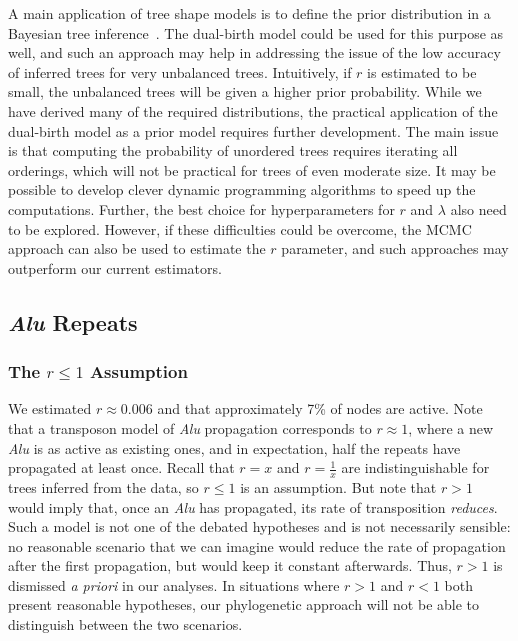 A main application of tree shape models is to define the prior distribution in a Bayesian tree inference~\cite{Drummond2007,Mooers2012}. The dual-birth model could be used for this purpose as well, and such an approach may help in addressing the issue of the low accuracy of inferred trees for very unbalanced trees. Intuitively, if $r$ is estimated to be small, the unbalanced trees will be given a higher prior probability. While we have derived many of the required distributions, the practical application of the dual-birth model as a prior model requires further development. The main issue is that computing the probability of unordered trees requires iterating all orderings, which will not be practical for trees of even moderate size. It may be possible to develop clever dynamic programming algorithms to speed up the computations. Further, the best choice for hyperparameters for $r$ and $\lambda$ also need to be explored. However, if these difficulties could be overcome, the \gls{MCMC} approach can also be used to estimate the $r$ parameter, and such approaches may outperform our current estimators.

\subsection{{\em Alu} Repeats}
\subsubsection{The $r\leq1$ Assumption}
We estimated $r\approx0.006$ and that approximately 7\% of nodes are active. Note that a transposon model of {\em Alu} propagation corresponds to $r\approx1$, where a new {\em Alu} is as active as existing ones, and in expectation, half the repeats have propagated at least once. Recall that $r=x$ and $r=\frac{1}{x}$  are indistinguishable for trees inferred from the data, so $r\leq 1$ is an assumption. But note that $r>1$ would imply that, once an {\em Alu} has propagated, its rate of transposition {\em reduces}. Such a model is not one of the debated hypotheses and is not necessarily sensible: no reasonable scenario that we can imagine would reduce the rate of propagation after the first propagation, but would keep it constant afterwards. Thus, $r>1$ is dismissed {\em a priori} in our analyses. In situations where $r>1$ and $r<1$ both present reasonable hypotheses, our phylogenetic approach will not be able to distinguish between the two scenarios.

